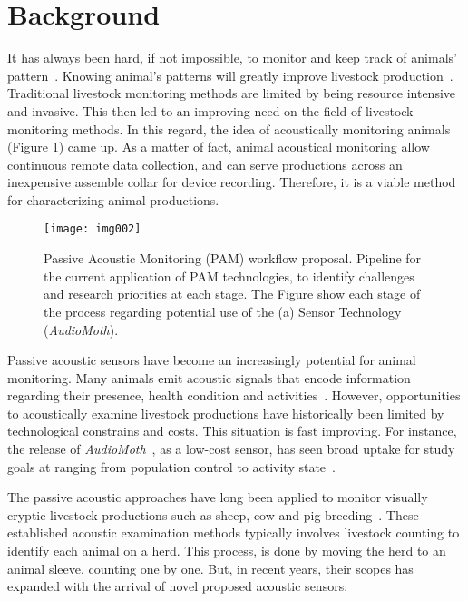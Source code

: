 \section{Background}
\label{sec:sec001}
It has always been hard, if not impossible, to monitor and keep track of animals' pattern~\cite{gibb2018emerging}.
Knowing animal's patterns will greatly improve livestock production~\cite{eldridge2016new, clink2017investigating}.
Traditional livestock monitoring methods are limited by being resource intensive and invasive.
This then led to an improving need on the field of livestock monitoring methods.
In this regard, the idea of acoustically monitoring animals (Figure \ref{fig:img002}) came up.
As a matter of fact, animal acoustical monitoring allow continuous remote data collection, and can serve productions across an inexpensive assemble collar for device recording.
Therefore, it is a viable method for characterizing animal productions.


\hfill

\begin{figure}[!ht]
\texttt{[image: img002]}
\caption{Passive Acoustic Monitoring (PAM) workflow proposal. Pipeline for the current application of PAM technologies, to identify challenges and research priorities at each stage. The Figure show each stage of the process regarding potential use of the (a) Sensor Technology (\textit{AudioMoth}).}
\label{fig:img002}
\end{figure}

\hfill


Passive acoustic sensors have become an increasingly potential for animal monitoring.
Many animals emit acoustic signals that encode information regarding their presence, health condition and activities~\cite{bradbury1998principles}.
However, opportunities to acoustically examine livestock productions have historically been limited by technological constrains and costs.
This situation is fast improving.
For instance, the release of \textit{AudioMoth}~\cite{hill2018audiomoth}, as a low-cost sensor, has seen broad uptake for study goals at ranging from population control to activity state~\cite{jones2013indicator, newson2015novel}.

The passive acoustic approaches have long been applied to monitor visually cryptic livestock productions such as sheep, cow and pig breeding~\cite{frost1997review}.
These established acoustic examination methods typically involves livestock counting to identify each animal on a herd.
This process, is done by moving the herd to an animal sleeve, counting one by one.
But, in recent years, their scopes has expanded with the arrival of novel proposed acoustic sensors.

